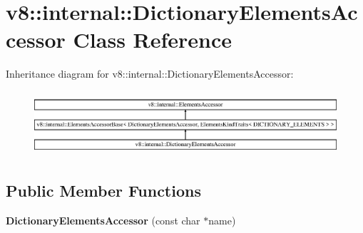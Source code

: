 \hypertarget{classv8_1_1internal_1_1_dictionary_elements_accessor}{}\section{v8\+:\+:internal\+:\+:Dictionary\+Elements\+Accessor Class Reference}
\label{classv8_1_1internal_1_1_dictionary_elements_accessor}
Inheritance diagram for v8\+:\+:internal\+:\+:Dictionary\+Elements\+Accessor\+:\begin{figure}[H]
\begin{center}
\leavevmode
\includegraphics[height=2.420749cm]{classv8_1_1internal_1_1_dictionary_elements_accessor}
\end{center}
\end{figure}
\subsection*{Public Member Functions}
\begin{DoxyCompactItemize}
\item 
\hypertarget{classv8_1_1internal_1_1_dictionary_elements_accessor_a2086b95eee2799dcba212b3127fdf5d7}{}{\bfseries Dictionary\+Elements\+Accessor} (const char $\ast$name)\label{classv8_1_1internal_1_1_dictionary_elements_accessor_a2086b95eee2799dcba212b3127fdf5d7}

\end{DoxyCompactItemize}
